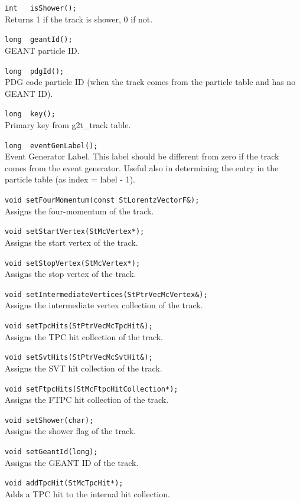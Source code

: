 \begin{Entry}
    \verb+int   isShower();+\\
    Returns 1 if the track is shower, 0 if not.

    \verb+long  geantId();+\\
    GEANT particle ID.

    \verb+long  pdgId();+\\
    PDG code particle ID (when the track comes from the particle table and has
    no GEANT ID).

    \verb+long  key();+\\
    Primary key from g2t\_track table.

    \verb+long  eventGenLabel();+\\
    Event Generator Label.  This label should be different from zero if the track
    comes from the event generator.  Useful also in determining the entry in the
    particle table (as index = label - 1).

    \verb+void setFourMomentum(const StLorentzVectorF&);+\\
    Assigns the four-momentum of the track.

    \verb+void setStartVertex(StMcVertex*);+\\
    Assigns the start vertex of the track.

    \verb+void setStopVertex(StMcVertex*);+\\
    Assigns the stop vertex of the track.

    \verb+void setIntermediateVertices(StPtrVecMcVertex&);+\\
    Assigns the intermediate vertex collection of the track.

    \verb+void setTpcHits(StPtrVecMcTpcHit&);+\\
    Assigns the TPC hit collection of the track.

    \verb+void setSvtHits(StPtrVecMcSvtHit&);+\\
    Assigns the SVT hit collection of the track.

    \verb+void setFtpcHits(StMcFtpcHitCollection*);+\\
    Assigns the FTPC hit collection of the track.

    \verb+void setShower(char);+\\
    Assigns the shower flag of the track.

    \verb+void setGeantId(long);+\\
    Assigns the GEANT ID of the track.

    \verb+void addTpcHit(StMcTpcHit*);+\\
    Adds a TPC hit to the internal hit collection.
    

\end{Entry}
